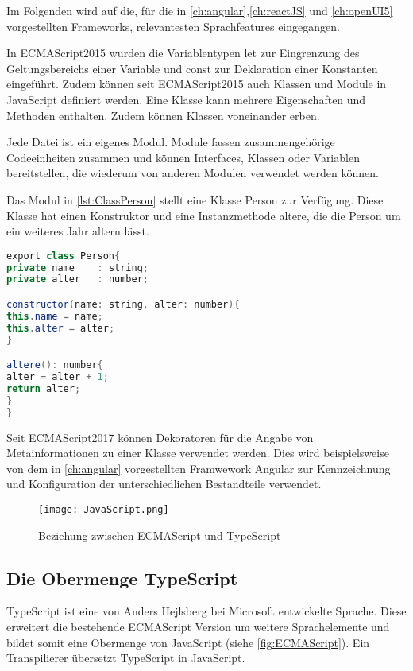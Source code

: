 Im Folgenden wird auf die, für die in \autoref{ch:angular},\ref{ch:reactJS} und \ref{ch:openUI5} vorgestellten Frameworks, relevantesten Sprachfeatures eingegangen.  

In ECMAScript2015 wurden die Variablentypen let zur Eingrenzung des Geltungsbereichs einer Variable und const zur Deklaration einer Konstanten eingeführt. Zudem können seit ECMAScript2015 auch Klassen und Module in JavaScript definiert werden. Eine Klasse kann mehrere Eigenschaften und Methoden enthalten. Zudem können Klassen voneinander erben.

Jede Datei ist ein eigenes Modul. Module fassen zusammengehörige Codeeinheiten zusammen und können Interfaces, Klassen oder Variablen bereitstellen, die wiederum von anderen Modulen verwendet werden können.\autocites[vgl.][34\psq]{Woiwode.2018}[vgl.][19\psqq]{Steyer.2017}

Das Modul in \autoref{lst:ClassPerson} stellt eine Klasse Person zur Verfügung. Diese Klasse hat einen Konstruktor und eine Instanzmethode altere, die die Person um ein weiteres Jahr altern lässt.

\begin{lstlisting}[caption=Eine Klasse Person wird von einem Modul bereitgestellt , label=lst:ClassPerson, language=Java]
export class Person{
private name 	: string;
private alter 	: number;

constructor(name: string, alter: number){
this.name = name;
this.alter = alter;
}

altere(): number{
alter = alter + 1;
return alter;
}
}
\end{lstlisting}

Seit ECMAScript2017 können Dekoratoren für die Angabe von Metainformationen zu einer Klasse verwendet werden. Dies wird beispielsweise von dem in \autoref{ch:angular} vorgestellten Framwework Angular zur Kennzeichnung und Konfiguration der unterschiedlichen Bestandteile verwendet.\autocites[vgl.][30\psqq]{Woiwode.2018} 

\begin{figure}[h]
	\centering
	\texttt{[image: JavaScript.png]}
	\caption{Beziehung zwischen ECMAScript und TypeScript} 
	\label{fig:ECMAScript}
\end{figure}

\subsection{Die Obermenge TypeScript}\label{sec:ts}
TypeScript ist eine von Anders Hejlsberg bei Microsoft entwickelte Sprache. Diese erweitert die bestehende ECMAScript Version um weitere Sprachelemente und bildet somit eine Obermenge von JavaScript (siehe \autoref{fig:ECMAScript}). Ein Transpilierer übersetzt TypeScript in JavaScript. 

